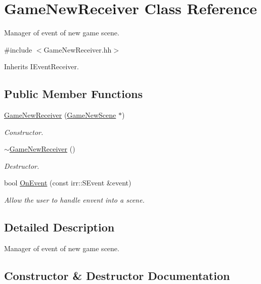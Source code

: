 \hypertarget{classGameNewReceiver}{}\section{Game\+New\+Receiver Class Reference}
\label{classGameNewReceiver}


Manager of event of new game scene.  




{\ttfamily \#include $<$Game\+New\+Receiver.\+hh$>$}



Inherits I\+Event\+Receiver.

\subsection*{Public Member Functions}
\begin{DoxyCompactItemize}
\item 
\hyperlink{classGameNewReceiver_a5907dae2976a963e1a8dd902b7a1e1c9}{Game\+New\+Receiver} (\hyperlink{classGameNewScene}{Game\+New\+Scene} $\ast$)
\begin{DoxyCompactList}\small\item\em Constructor. \end{DoxyCompactList}\item 
\hyperlink{classGameNewReceiver_ab92b6653b56d291853a4e2f737eaf6fd}{$\sim$\+Game\+New\+Receiver} ()
\begin{DoxyCompactList}\small\item\em Destructor. \end{DoxyCompactList}\item 
bool \hyperlink{classGameNewReceiver_ad9ec097d8b46946ed1a21c24463fc0b6}{On\+Event} (const irr\+::\+S\+Event \&event)
\begin{DoxyCompactList}\small\item\em Allow the user to handle envent into a scene. \end{DoxyCompactList}\end{DoxyCompactItemize}


\subsection{Detailed Description}
Manager of event of new game scene. 

\subsection{Constructor \& Destructor Documentation}
\mbox{\label{classGameNewReceiver_a5907dae2976a963e1a8dd902b7a1e1c9}} 

